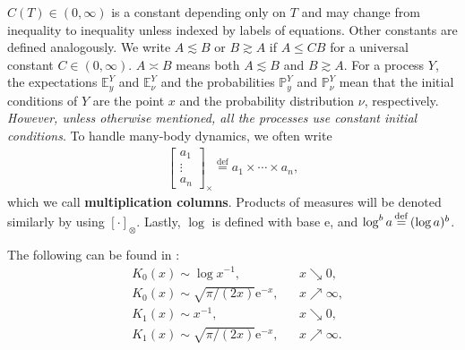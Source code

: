 \documentclass[12pt, twoside]{article}
\numberwithin{figure}{section}
\newcommand{\less}{\lesssim}
\newcommand{\more}{\gtrsim}
\newcommand{\e}{{\mathrm e}}
\newcommand{\1}{\mathds 1}
\renewcommand{\P}{{\mathbb P}}
\newcommand{\E}{{\mathbb E}}
\newcommand{\2}{{\mathbf 1}}
\newcommand{\defeq}{{\stackrel{\rm def}{=}}}
\begin{document}
 $C(T)\in(0,\infty)$ is a constant depending only on $T$ and may change from inequality to inequality unless indexed by labels of equations. Other constants are defined analogously. We write $A\less B$ or $B\more A$ if $A\leq CB$ for a universal constant $C\in (0,\infty)$. $A\asymp B$ means both $A\less B$ and $B\more A$. For a process $Y$, the expectations $\E^Y_y$ and $\E^Y_\nu$ and the probabilities $\P^Y_y$ and $\P^Y_\nu$ mean that the initial conditions of $Y$ are the point $x$ and the probability distribution $\nu$, respectively. \emph{However, unless otherwise mentioned, all the processes use constant initial conditions}. To handle many-body dynamics, we often write
\begin{align}
\label{def:column} 
\begin{bmatrix} a_{1}
\\
\vdots
\\
a_{n} \end{bmatrix}_{\times } \stackrel{\mathrm{def}} {=}
a_{1} \times \cdots \times a_{n},
\end{align}
which we call {\bf multiplication columns}. Products of measures will be denoted similarly by using
$[\cdot ]_{\otimes}$. Lastly, $\log $ is defined with base $\e$, and $\log^ba\,\defeq\, (\log a)^b$. \smallskip 

 The following can be found in \cite[p.136]{Lebedev}:
\begin{align}
&K_0(x)\sim \log x^{-1},&& x\searrow 0,\label{K00}\\
&K_0(x)\sim \sqrt{\pi/(2x)}\e^{-x},&&x\nearrow\infty,\label{K0infty}\\
&K_1(x)\sim  x^{-1},&& x\searrow 0,\label{K10}\\
&K_1(x)\sim \sqrt{\pi/(2x)}\e^{-x},&& x\nearrow\infty.\label{K1infty}
\end{align}
\end{document}
